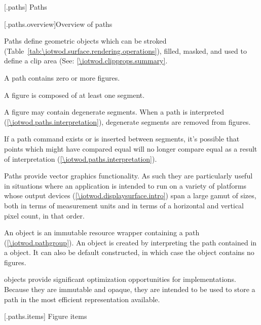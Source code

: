 
 [\iotwod.paths] {Paths}

 [\iotwod.paths.overview]{Overview of paths}

\pnum
Paths define geometric objects which can be stroked (Table~\ref{tab:\iotwod.surface.rendering.operations}), filled, masked, and used to define a clip area (See: \ref{\iotwod.clipprops.summary}.

\pnum
A path contains zero or more figures.

\pnum
A figure is composed of at least one segment.

\pnum
A figure may contain degenerate segments. When a path is interpreted (\ref{\iotwod.paths.interpretation}), degenerate segments are removed from figures.
\begin{note}
If a path command exists or is inserted between segments, it's possible that points which might have compared equal will no longer compare equal as a result of interpretation (\ref{\iotwod.paths.interpretation}).
\end{note}

\pnum
Paths provide vector graphics functionality. As such they are particularly useful in situations where an application is intended to run on a variety of platforms whose output devices (\ref{\iotwod.displaysurface.intro}) span a large gamut of sizes, both in terms of measurement units and in terms of a horizontal and vertical pixel count, in that order.

\pnum
An  object is an immutable resource wrapper containing a path (\ref{\iotwod.pathgroup}). An  object is created by interpreting the path contained in a  object. It can also be default constructed, in which case the  object contains no figures.
\begin{note}
 objects provide significant optimization opportunities for implementations. Because they are immutable and opaque, they are intended to be used to store a path in the most efficient representation available.
\end{note}



 [\iotwod.paths.items] {Figure items}

\addtocounter{SectionDepthBase}{2}















\addtocounter{SectionDepthBase}{-2}

\addtocounter{SectionDepthBase}{1}


\addtocounter{SectionDepthBase}{-1}

